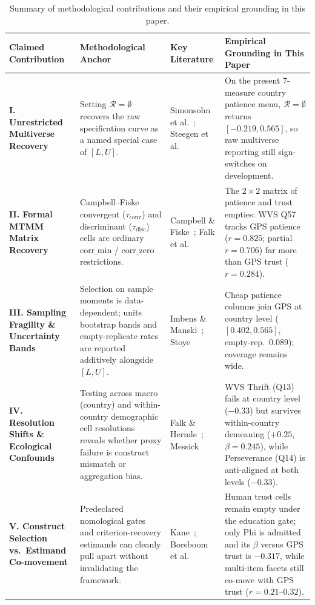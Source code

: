 \documentclass[10pt,letterpaper]{article}
\newcommand{\Rset}{\mathcal{R}}
\begin{document}
\begin{table}[p]
\centering
\small
\caption{Summary of methodological contributions and their empirical grounding in this paper.}
\label{tab:synthesis_contributions}
\begin{tabularx}{\textwidth}{@{}>{\raggedright\arraybackslash}p{2.6cm} >{\raggedright\arraybackslash}p{3.1cm} >{\raggedright\arraybackslash}p{2.6cm} X@{}}
\toprule
\textbf{Claimed Contribution} & \textbf{Methodological Anchor} & \textbf{Key Literature} & \textbf{Empirical Grounding in This Paper} \\
\midrule
\textbf{I. Unrestricted Multiverse Recovery} & Setting $\Rset=\emptyset$ recovers the raw specification curve as a named special case of $[L, U]$. & Simonsohn et al.~\cite{simonsohn2020}; Steegen et al.~\cite{steegen2016} & On the present 7-measure country patience menu, $\Rset=\emptyset$ returns $[-0.219, 0.565]$, so raw multiverse reporting still sign-switches on development. \\
\addlinespace
\textbf{II. Formal MTMM Matrix Recovery} & Campbell--Fiske convergent ($\tau_{\text{conv}}$) and discriminant ($\tau_{\text{disc}}$) cells are ordinary $\mathrm{corr\_min}$ / $\mathrm{corr\_zero}$ restrictions. & Campbell \& Fiske~\cite{campbell1959}; Falk et al.~\cite{falk2018} & The $2\times 2$ matrix of patience and trust empties: WVS Q57 tracks GPS patience ($r=0.825$; partial $r=0.706$) far more than GPS trust ($r=0.284$). \\
\addlinespace
\textbf{III. Sampling Fragility \& Uncertainty Bands} & Selection on sample moments is data-dependent; units bootstrap bands and empty-replicate rates are reported additively alongside $[L, U]$. & Imbens \& Manski~\cite{imbensmanski2004}; Stoye~\cite{stoye2009} & Cheap patience columns join GPS at country level ($[0.402,0.565]$, empty-rep.\ $0.089$); coverage remains wide. \\
\addlinespace
\textbf{IV. Resolution Shifts \& Ecological Confounds} & Testing across macro (country) and within-country demographic cell resolutions reveals whether proxy failure is construct mismatch or aggregation bias. & Falk \& Hermle~\cite{falkhermle2018}; Messick~\cite{messick1995} & WVS Thrift (Q13) fails at country level ($-0.33$) but survives within-country demeaning ($+0.25$, $\beta=0.245$), while Perseverance (Q14) is anti-aligned at both levels ($-0.33$). \\
\addlinespace
\textbf{V. Construct Selection vs.\ Estimand Co-movement} & Predeclared nomological gates and criterion-recovery estimands can cleanly pull apart without invalidating the framework. & Kane~\cite{kane2013}; Borsboom et al.~\cite{borsboom2004} & Human trust cells remain empty under the education gate; only Phi is admitted and its $\beta$ versus GPS trust is $-0.317$, while multi-item facets still co-move with GPS trust ($r=0.21$--$0.32$). \\
\bottomrule
\end{tabularx}
\end{table}
\end{document}
